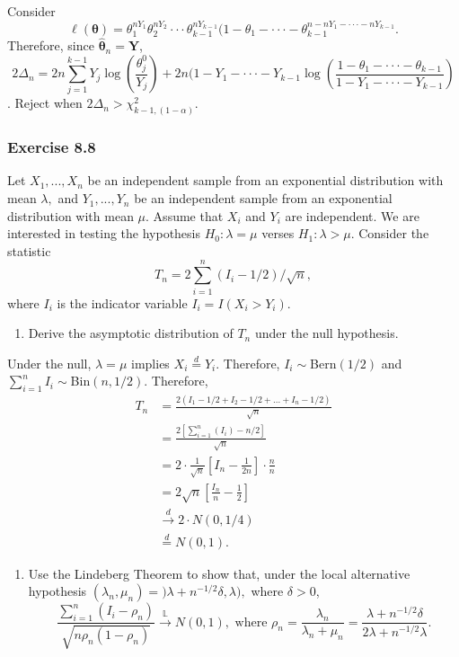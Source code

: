\documentclass[12pt,]{article}
\providecommand{\tightlist}{%
  \setlength{\itemsep}{0pt}\setlength{\parskip}{0pt}}
\begin{document}
Consider
\[\ell(\boldsymbol \theta)=\theta_1^{nY_1}\theta_2^{nY_2}\cdot\cdot\cdot\theta_{k-1}^{nY_{k-1}}(1-\theta_1-\cdot \cdot \cdot -\theta_{k-1}^{n-nY_1-\cdot\cdot\cdot -nY_{k-1}}.\]
Therefore, since \(\hat{\boldsymbol \theta}_n=\boldsymbol Y\),
\[2\Delta_n=2n\sum_{j=1}^{k-1}Y_j\log\left(\frac{\theta_j^0}{Y_j}\right)+2n(1-Y_1-\cdot\cdot\cdot-Y_{k-1}\log\left(\frac{1-\theta_1-\cdot\cdot\cdot-\theta_{k-1}}{1-Y_1-\cdot\cdot\cdot-Y_{k-1}}\right)\].
Reject when \(2\Delta_n>\chi^2_{k-1,(1-\alpha)}.\)

\hypertarget{exercise-8.8}{%
\subsubsection{Exercise 8.8}\label{exercise-8.8}}

Let \(X_1,...,X_n\) be an independent sample from an exponential
distribution with mean \(\lambda,\) and \(Y_1,...,Y_n\) be an
independent sample from an exponential distribution with mean \(\mu.\)
Assume that \(X_i\) and \(Y_i\) are independent. We are interested in
testing the hypothesis \(H_0: \lambda = \mu\) verses
\(H_1: \lambda > \mu\). Consider the statistic
\[T_n=2\sum_{i=1}^n(I_i-1/2)/\sqrt{n},\] where \(I_i\) is the indicator
variable \(I_i=I(X_i>Y_i).\)

\begin{enumerate}
\def\labelenumi{(\alph{enumi})}
\tightlist
\item
  Derive the asymptotic distribution of \(T_n\) under the null
  hypothesis.
\end{enumerate}

Under the null, \(\lambda = \mu\) implies \(X_i \overset{d}= Y_i\).
Therefore, \(I_i\sim\)Bern\((1/2)\) and
\(\sum_{i=1}^nI_i\sim\)Bin\((n,1/2)\). Therefore, \begin{align*}
T_n&=\frac{2(I_1-1/2+I_2-1/2+...+I_n-1/2)}{\sqrt{n}}\\
&=\frac{2[\sum_{i=1}^n(I_i)-n/2]}{\sqrt{n}}\\
&=2\cdot\frac{1}{\sqrt{n}}\left[I_n-\frac{1}{2n}\right]\cdot \frac{n}{n}\\
&=2\sqrt{n}\left[\frac{I_n}{n}-\frac{1}{2}\right]\\
& \overset{d}\rightarrow 2\cdot N(0,1/4)\\
& \overset{d}=N(0,1).
\end{align*}

\begin{enumerate}
\def\labelenumi{(\alph{enumi})}
\setcounter{enumi}{1}
\tightlist
\item
  Use the Lindeberg Theorem to show that, under the local alternative
  hypothesis \((\lambda_n,\mu_n)=)\lambda+n^{-1/2}\delta,\lambda),\)
  where \(\delta>0\),
  \[\frac{\sum_{i=1}^n(I_i-\rho_n)}{\sqrt{n\rho_n(1-\rho_n)}}\overset{\mathbb{L}}\rightarrow N(0,1), \text{ where }\rho_n=\frac{\lambda_n}{\lambda_n+\mu_n}=\frac{\lambda+n^{-1/2}\delta}{2\lambda+n^{-1/2}\lambda}.\]
\end{enumerate}
\end{document}

